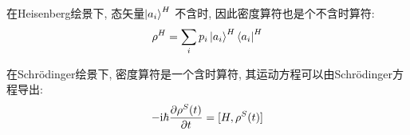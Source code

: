 在Heisenberg绘景下, 态矢量$\ket{a_{i}}^{H}$ 不含时, 因此密度算符也是个不含时算符:
\begin{equation}
  \begin{aligned}
    \rho^{H} = \sum_{i} p_{i} \ket{a_{i}}^{H}\bra{a_{i}}^{H}
  \end{aligned}
\end{equation}

在Schr\"odinger绘景下, 密度算符是一个含时算符, 其运动方程可以由Schr\"odinger方程导出:
\begin{equation}\label{eq:density_op_Liouville_eq}
  \begin{aligned}
    - {\rm i} \hbar \pdv{\rho^{S}(t)}{t} = [H, \rho^{S}(t)]
  \end{aligned}
\end{equation}


